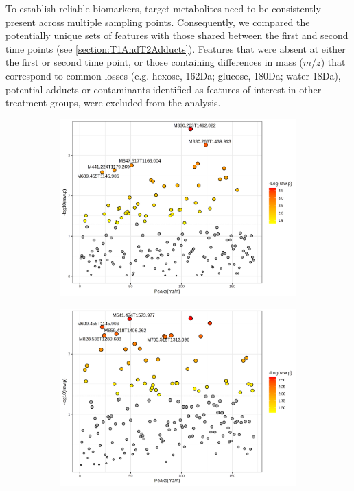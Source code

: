 To establish reliable biomarkers, target metabolites need to be consistently present across multiple sampling points. Consequently, we compared the potentially unique sets of features with those shared between the first and second time points (see \ref{section:T1AndT2Adducts}). Features that were absent at either the first or second time point, or those containing differences in mass ($m/z$) that correspond to common losses (e.g. hexose, 162Da; glucose, 180Da; water 18Da), potential adducts or contaminants identified as features of interest in other treatment groups, were excluded from the analysis.

\begin{figure}[hp!]
    \centering
    \begin{subfigure}[b]{0.49\textwidth}
        \includegraphics[width=\textwidth]{Figures/Sig171FeaturesRedGroupsDroVsConSecondTimePoint_t-test.png}
        \caption{}
        \label{fig:DroVsCon_t-test}
    \end{subfigure}
    \begin{subfigure}[b]{0.49\textwidth}
        \includegraphics[width=\textwidth]{Figures/Sig171FeaturesRedSamplesXvmVsConSecondTimePoint_t_test.png}

\end{subfigure}
\end{figure}
